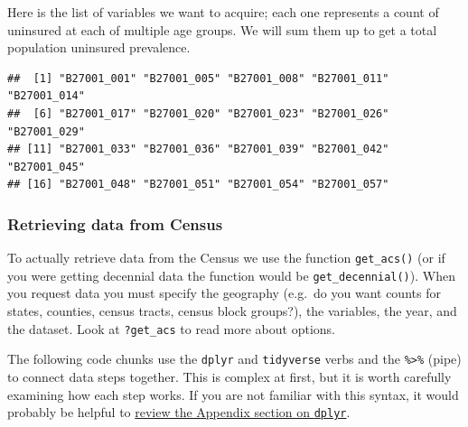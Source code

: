 \documentclass[
]{book}
\newenvironment{Shaded}{\begin{snugshade}}{\end{snugshade}}
\newcommand{\CommentTok}[1]{\textcolor[rgb]{0.56,0.35,0.01}{\textit{#1}}}
\newcommand{\FunctionTok}[1]{\textcolor[rgb]{0.00,0.00,0.00}{#1}}
\newcommand{\NormalTok}[1]{#1}
\newcommand{\OtherTok}[1]{\textcolor[rgb]{0.56,0.35,0.01}{#1}}
\newcommand{\SpecialCharTok}[1]{\textcolor[rgb]{0.00,0.00,0.00}{#1}}
\newcommand{\StringTok}[1]{\textcolor[rgb]{0.31,0.60,0.02}{#1}}
\begin{document}
\begin{Shaded}
\end{Shaded}

Here is the list of variables we want to acquire; each one represents a count of uninsured at each of multiple age groups. We will sum them up to get a total population uninsured prevalence.

\begin{verbatim}
##  [1] "B27001_001" "B27001_005" "B27001_008" "B27001_011" "B27001_014"
##  [6] "B27001_017" "B27001_020" "B27001_023" "B27001_026" "B27001_029"
## [11] "B27001_033" "B27001_036" "B27001_039" "B27001_042" "B27001_045"
## [16] "B27001_048" "B27001_051" "B27001_054" "B27001_057"
\end{verbatim}

\hypertarget{retrieving-data-from-census}{%
\subsubsection{Retrieving data from Census}\label{retrieving-data-from-census}}

To actually retrieve data from the Census we use the function \texttt{get\_acs()} (or if you were getting decennial data the function would be \texttt{get\_decennial()}). When you request data you must specify the geography (e.g.~do you want counts for states, counties, census tracts, census block groups?), the variables, the year, and the dataset. Look at \texttt{?get\_acs} to read more about options.

The following code chunks use the \texttt{dplyr} and \texttt{tidyverse} verbs and the \texttt{\%\textgreater{}\%} (pipe) to connect data steps together. This is complex at first, but it is worth carefully examining how each step works. If you are not familiar with this syntax, it would probably be helpful to \protect\hyperlink{dplyr}{review the Appendix section on \texttt{dplyr}}.
\end{document}
